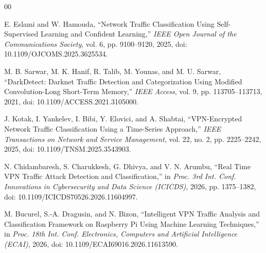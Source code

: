\documentclass[conference]{IEEEtran}
\begin{document}
\begin{thebibliography}{00}
 
E. Eslami and W. Hamouda, ``Network Traffic Classification Using
Self-Supervised Learning and Confident Learning,'' \textit{IEEE Open
Journal of the Communications Society}, vol. 6, pp. 9100--9120, 2025,
doi: 10.1109/OJCOMS.2025.3625534.

M. B. Sarwar, M. K. Hanif, R. Talib, M. Younas, and M. U. Sarwar,
``DarkDetect: Darknet Traffic Detection and Categorization Using
Modified Convolution-Long Short-Term Memory,'' \textit{IEEE Access},
vol. 9, pp. 113705--113713, 2021,
doi: 10.1109/ACCESS.2021.3105000.

J. Kotak, I. Yankelev, I. Bibi, Y. Elovici, and A. Shabtai,
``VPN-Encrypted Network Traffic Classification Using a Time-Series
Approach,'' \textit{IEEE Transactions on Network and Service
Management}, vol. 22, no. 2, pp. 2225--2242, 2025,
doi: 10.1109/TNSM.2025.3543903.

N. Chidambaresh, S. Charukkesh, G. Dhivya, and V. N. Arumbu,
``Real Time VPN Traffic Attack Detection and Classification,''
in \textit{Proc. 3rd Int. Conf. Innovations in Cybersecurity and
Data Science (ICICDS)}, 2026, pp. 1375--1382, doi: 10.1109/ICICDS70526.2026.11604997.

M. Bucurel, S.-A. Dragusin, and N. Bizon,
``Intelligent VPN Traffic Analysis and Classification Framework on
Raspberry Pi Using Machine Learning Techniques,'' in
\textit{Proc. 18th Int. Conf. Electronics, Computers and Artificial
Intelligence (ECAI)}, 2026,
doi: 10.1109/ECAI69016.2026.11613590.

 
\end{thebibliography}
 
\end{document}

